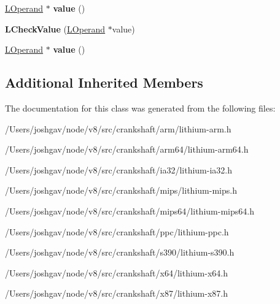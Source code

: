 \begin{DoxyCompactItemize}
\item 
\hyperlink{classv8_1_1internal_1_1_l_operand}{L\+Operand} $\ast$ {\bfseries value} ()\hypertarget{classv8_1_1internal_1_1_l_check_value_a15deaca0b977cd44d4312ec494f52fb7}{}\label{classv8_1_1internal_1_1_l_check_value_a15deaca0b977cd44d4312ec494f52fb7}

\item 
{\bfseries L\+Check\+Value} (\hyperlink{classv8_1_1internal_1_1_l_operand}{L\+Operand} $\ast$value)\hypertarget{classv8_1_1internal_1_1_l_check_value_ace321d6fb2fcb145c57f62e25f85a238}{}\label{classv8_1_1internal_1_1_l_check_value_ace321d6fb2fcb145c57f62e25f85a238}

\item 
\hyperlink{classv8_1_1internal_1_1_l_operand}{L\+Operand} $\ast$ {\bfseries value} ()\hypertarget{classv8_1_1internal_1_1_l_check_value_a15deaca0b977cd44d4312ec494f52fb7}{}\label{classv8_1_1internal_1_1_l_check_value_a15deaca0b977cd44d4312ec494f52fb7}

\end{DoxyCompactItemize}
\subsection*{Additional Inherited Members}


The documentation for this class was generated from the following files\+:\begin{DoxyCompactItemize}
\item 
/\+Users/joshgav/node/v8/src/crankshaft/arm/lithium-\/arm.\+h\item 
/\+Users/joshgav/node/v8/src/crankshaft/arm64/lithium-\/arm64.\+h\item 
/\+Users/joshgav/node/v8/src/crankshaft/ia32/lithium-\/ia32.\+h\item 
/\+Users/joshgav/node/v8/src/crankshaft/mips/lithium-\/mips.\+h\item 
/\+Users/joshgav/node/v8/src/crankshaft/mips64/lithium-\/mips64.\+h\item 
/\+Users/joshgav/node/v8/src/crankshaft/ppc/lithium-\/ppc.\+h\item 
/\+Users/joshgav/node/v8/src/crankshaft/s390/lithium-\/s390.\+h\item 
/\+Users/joshgav/node/v8/src/crankshaft/x64/lithium-\/x64.\+h\item 
/\+Users/joshgav/node/v8/src/crankshaft/x87/lithium-\/x87.\+h\end{DoxyCompactItemize}
